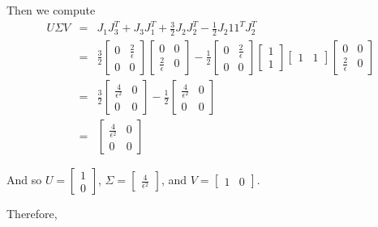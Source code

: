 \documentclass[12pt]{article}
\begin{document}
Then we compute
\begin{eqnarray}
U \Sigma V &=& 
J_1 J_3^T + J_3 J_1^T + \frac{3}{2} J_2 J_2^T - \frac{1}{2} J_2 1 1^T J_2^T \\
&=& \frac{3}{2} 
\begin{bmatrix} 0 & \frac{2}{\epsilon} \\ 0 & 0 \end{bmatrix}
\begin{bmatrix} 0 & 0 \\ \frac{2}{\epsilon} & 0 \end{bmatrix}
-\frac{1}{2}
\begin{bmatrix} 0 & \frac{2}{\epsilon} \\ 0 & 0 \end{bmatrix}
\begin{bmatrix} 1 \\ 1 \end{bmatrix}
\begin{bmatrix} 1 & 1 \end{bmatrix}
\begin{bmatrix} 0 & 0 \\ \frac{2}{\epsilon} & 0 \end{bmatrix} \\
&=& \frac{3}{2}
\begin{bmatrix} \frac{4}{\epsilon^2} & 0 \\ 0 & 0 \end{bmatrix}
-\frac{1}{2}
\begin{bmatrix} \frac{4}{\epsilon^2} & 0 \\ 0 & 0 \end{bmatrix} \\
&=& \begin{bmatrix} \frac{4}{\epsilon^2} & 0 \\ 0 & 0 \end{bmatrix}
\end{eqnarray}

And so 
$U = \begin{bmatrix} 1 \\ 0 \end{bmatrix}$, 
$\Sigma = \begin{bmatrix} \frac{4}{\epsilon^2} \end{bmatrix}$, and
$V = \begin{bmatrix} 1 & 0 \end{bmatrix}$.

Therefore,
\end{document}
